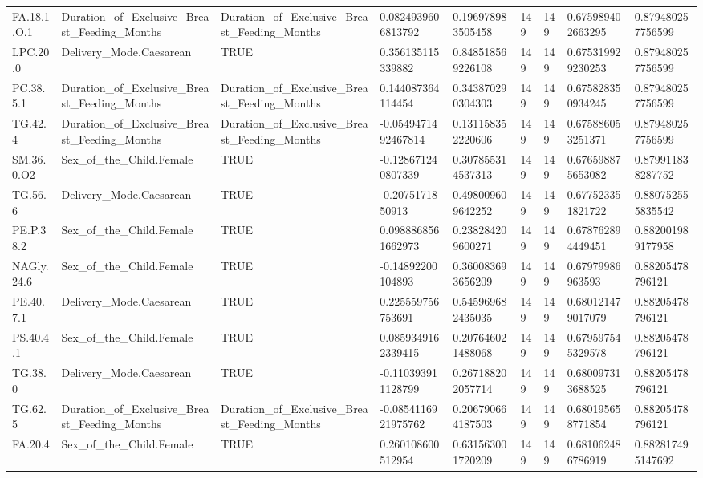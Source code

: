 \begin{longtable}{lllllllll}
FA.18.1.O.1 & Duration\_of\_Exclusive\_Breast\_Feeding\_Months & Duration\_of\_Exclusive\_Breast\_Feeding\_Months & 0.0824939606813792 & 0.196978983505458 & 149 & 149 & 0.675989402663295 & 0.879480257756599 \\
LPC.20.0 & Delivery\_Mode.Caesarean & TRUE & 0.356135115339882 & 0.848518569226108 & 149 & 149 & 0.675319929230253 & 0.879480257756599 \\
PC.38.5.1 & Duration\_of\_Exclusive\_Breast\_Feeding\_Months & Duration\_of\_Exclusive\_Breast\_Feeding\_Months & 0.144087364114454 & 0.343870290304303 & 149 & 149 & 0.675828350934245 & 0.879480257756599 \\
TG.42.4 & Duration\_of\_Exclusive\_Breast\_Feeding\_Months & Duration\_of\_Exclusive\_Breast\_Feeding\_Months & -0.0549471492467814 & 0.131158352220606 & 149 & 149 & 0.675886053251371 & 0.879480257756599 \\
SM.36.0.O2 & Sex\_of\_the\_Child.Female & TRUE & -0.128671240807339 & 0.307855314537313 & 149 & 149 & 0.676598875653082 & 0.879911838287752 \\
TG.56.6 & Delivery\_Mode.Caesarean & TRUE & -0.2075171850913 & 0.498009609642252 & 149 & 149 & 0.677523351821722 & 0.880752555835542 \\
PE.P.38.2 & Sex\_of\_the\_Child.Female & TRUE & 0.0988868561662973 & 0.238284209600271 & 149 & 149 & 0.678762894449451 & 0.882001989177958 \\
NAGly.24.6 & Sex\_of\_the\_Child.Female & TRUE & -0.14892200104893 & 0.360083693656209 & 149 & 149 & 0.67979986963593 & 0.88205478796121 \\
PE.40.7.1 & Delivery\_Mode.Caesarean & TRUE & 0.225559756753691 & 0.545969682435035 & 149 & 149 & 0.680121479017079 & 0.88205478796121 \\
PS.40.4.1 & Sex\_of\_the\_Child.Female & TRUE & 0.0859349162339415 & 0.207646021488068 & 149 & 149 & 0.679597545329578 & 0.88205478796121 \\
TG.38.0 & Delivery\_Mode.Caesarean & TRUE & -0.110393911128799 & 0.267188202057714 & 149 & 149 & 0.680097313688525 & 0.88205478796121 \\
TG.62.5 & Duration\_of\_Exclusive\_Breast\_Feeding\_Months & Duration\_of\_Exclusive\_Breast\_Feeding\_Months & -0.0854116921975762 & 0.206790664187503 & 149 & 149 & 0.680195658771854 & 0.88205478796121 \\
FA.20.4 & Sex\_of\_the\_Child.Female & TRUE & 0.260108600512954 & 0.631563001720209 & 149 & 149 & 0.681062486786919 & 0.882817495147692 \\

\end{longtable}
